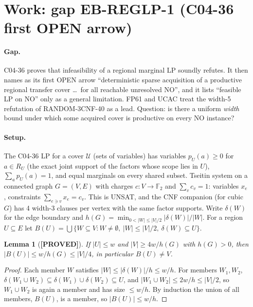 \documentclass[11pt]{article}
\newtheorem{lemma}[theorem]{Lemma}
\theoremstyle{remark}
\newcommand{\lab}[1]{\textbf{[#1]}}
\newcommand{\F}{\mathbb{F}_2}
\begin{document}
\section{Work: gap EB-REGLP-1 (C04-36 first OPEN arrow)}
\paragraph{Gap.} C04-36 proves that infeasibility of a regional marginal LP soundly refutes. It then
names as its first OPEN arrow ``deterministic sparse acquisition of a productive regional transfer
cover \ldots\ for all reachable unresolved NO'', and it lists ``feasible LP on NO'' only as a general
limitation. FP61 and UCAC treat the width-5 refutation of RANDOM-3CNF-40 as a lead. Question: is
there a uniform \emph{width} bound under which some acquired cover is productive on every NO
instance?

\paragraph{Setup.} The C04-36 LP for a cover $\mathcal U$ (sets of variables) has variables
$p_U(a)\ge 0$ for $a\in R_U$ (the exact joint support of the factors whose scope lies in $U$),
$\sum_a p_U(a)=1$, and equal marginals on every shared subset. Tseitin system on a connected
graph $G=(V,E)$ with charges $c:V\to\F$ and $\sum_v c_v=1$: variables $x_e$, constraints
$\sum_{e\ni v}x_e=c_v$. This is UNSAT, and the CNF companion (for cubic $G$) has 4 width-3 clauses per
vertex with the same factor supports. Write $\delta(W)$ for the edge boundary and
$h(G)=\min_{0<|W|\le|V|/2}|\delta(W)|/|W|$.
For a region $U\subseteq E$ let
$B(U)=\bigcup\{W\subseteq V: W\ne\emptyset,\ |W|\le|V|/2,\ \delta(W)\subseteq U\}$.

\begin{lemma}[\lab{PROVED}]\label{lem:B}
If $|U|\le w$ and $|V|\ge 4w/h(G)$ with $h(G)>0$, then $|B(U)|\le w/h(G)\le |V|/4$, in particular $B(U)\ne V$.
\end{lemma}
\begin{proof}
Each member $W$ satisfies $|W|\le|\delta(W)|/h\le w/h$. For members $W_1,W_2$,
$\delta(W_1\cup W_2)\subseteq\delta(W_1)\cup\delta(W_2)\subseteq U$, and
$|W_1\cup W_2|\le 2w/h\le|V|/2$, so $W_1\cup W_2$ is again a member and has size $\le w/h$.
By induction the union of all members, $B(U)$, is a member, so $|B(U)|\le w/h$.
\end{proof}
\end{document}
